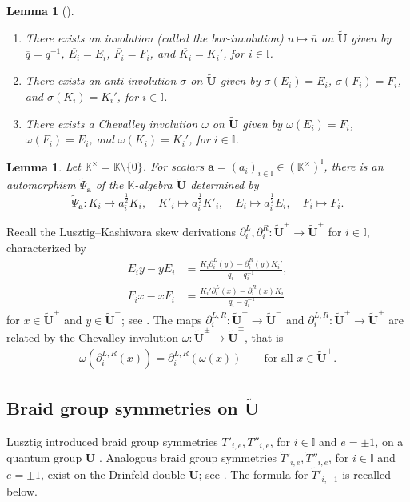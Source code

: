 \documentclass[a4paper,reqno,12pt]{amsart}
\numberwithin{equation}{section}
\newtheorem{lemma}[proposition]{Lemma}
\theoremstyle{definition}
\theoremstyle{plain}
\theoremstyle{definition}
\def\K{\mathbb K}
\def\I{\mathbb I}
\def \ba{{\mathbf a}}
\def\tU{\widetilde{\mathbf U}}
\def\tTD{\widetilde T}
\def \ov{\overline}
\begin{document}
	\begin{lemma}[\cite{Lus93}] 
		\label{lem:anti-involut-QG}
		\quad
		\begin{enumerate}
			\item There exists an involution (called the bar-involution) $u\mapsto \ov{u}$ on $\tU$ given by $\ov{q}=q^{-1}$, $\ov{E_i}=E_i$, $\ov{F_i}=F_i$, and $\ov{K_i}=K_i'$, for $i\in\I$.
			\item 
			There exists an anti-involution $\sigma$ on $\tU$ given by $\sigma(E_i)=E_i$, $\sigma(F_i)=F_i$, and $\sigma(K_i)=K_i'$, for $i\in\I$.
			\item 
			There exists a Chevalley involution $\omega$ on $\tU$ given by $\omega(E_i)=F_i$, $\omega(F_i)=E_i$, and $\omega(K_i)=K_i'$, for $i\in\I$.
		\end{enumerate}
	\end{lemma}

    \begin{lemma} \label{lem:twisting Psi}
		Let $\K^\times=\K\setminus\{0\}$. For scalars $\ba=(a_i)_{i\in\I}\in (\K^{\times})^\I$, there is an automorphism $\widetilde{\Psi}_{\ba}$ of the $\K$-algebra $\tU$ determined by
		\[
		\widetilde{\Psi}_{\ba}:K_i\mapsto a_i^{\frac{1}{2}}K_i,\quad K'_i\mapsto a_i^{\frac{1}{2}}K'_i,\quad E_i\mapsto a_i^{\frac{1}{2}}E_i,\quad F_i\mapsto F_i.
		\]
	\end{lemma}


Recall the Lusztig--Kashiwara skew derivations $\partial_i^L,\partial_i^R: \tU^\pm \rightarrow \tU^\pm$ for $i\in \I$, characterized by
\begin{align}
  E_i y - y E_i &= \frac{K_i \partial_i^L(y)-\partial_i^R(y)K_i'}{q_i-q_i^{-1}},\label{eq:EyyE}\\
  F_i x - x F_i &= \frac{K_i' \partial_i^L(x)-\partial_i^R(x)K_i}{q_i-q_i^{-1}}\label{eq:FxxF}
\end{align}
for $x\in \tU^+$ and $y\in \tU^-$; see \cite[Proposition 3.1.6]{Lus93}. The maps $\partial_i^{L,R}:\tU^-\rightarrow \tU^-$ and $\partial_i^{L,R}:\tU^+\rightarrow \tU^+$ are related by the Chevalley involution $\omega:\tU^\pm\rightarrow \tU^\mp$, that is
\begin{align*}
  \omega(\partial_i^{L,R}(x))=\partial_i^{L,R}(\omega(x)) \qquad \mbox{for all $x\in \tU^+$}.
\end{align*}

\subsection{Braid group symmetries on \texorpdfstring{$\tU$}{U}}
Lusztig introduced braid group symmetries $T'_{i,e},T''_{i,e}$, for $i\in \I$ and $e =\pm 1$, on a quantum group $\mathbf U$ \cite[\S 37.1.3]{Lus93}.
Analogous braid group symmetries $\tTD'_{i,e},\tTD''_{i,e}$, for $i\in \I$ and $e =\pm 1$, exist on the Drinfeld double $\tU$; see \cite[Propositions 6.20--6.21]{LW21b}. The formula for $\tTD'_{i,-1}$ is recalled below.
\end{document}
